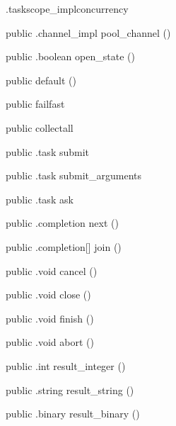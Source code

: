 \begin{CrexxClass}{.taskscope\_impl}{concurrency}
\begin{Members}
    \Method
      {public}
      {.channel\_impl}
      {pool\_channel}
      {()}

    \Method
      {public}
      {.boolean}
      {open\_state}
      {()}

    \Factory
      {public}
      {default}
      {()}

    \Factory
      {public}
      {failfast}
      {}

    \Factory
      {public}
      {collectall}
      {}

    \Method
      {public}
      {.task}
      {submit}
      {}

    \Method
      {public}
      {.task}
      {submit\_arguments}
      {}

    \Method
      {public}
      {.task}
      {ask}
      {}

    \Method
      {public}
      {.completion}
      {next}
      {()}

    \Method
      {public}
      {.completion[]}
      {join}
      {()}

    \Method
      {public}
      {.void}
      {cancel}
      {()}

    \Method
      {public}
      {.void}
      {close}
      {()}

    \Method
      {public}
      {.void}
      {finish}
      {()}

    \Method
      {public}
      {.void}
      {abort}
      {()}

    \Method
      {public}
      {.int}
      {result\_integer}
      {()}

    \Method
      {public}
      {.string}
      {result\_string}
      {()}

    \Method
      {public}
      {.binary}
      {result\_binary}
      {()}


\end{Members}
\end{CrexxClass}
